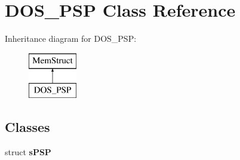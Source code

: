 \hypertarget{classDOS__PSP}{\section{D\-O\-S\-\_\-\-P\-S\-P Class Reference}
\label{classDOS__PSP}
}
Inheritance diagram for D\-O\-S\-\_\-\-P\-S\-P\-:\begin{figure}[H]
\begin{center}
\leavevmode
\includegraphics[height=2.000000cm]{classDOS__PSP}
\end{center}
\end{figure}
\subsection*{Classes}
\begin{DoxyCompactItemize}
\item 
struct {\bfseries s\-P\-S\-P}
\end{DoxyCompactItemize}
